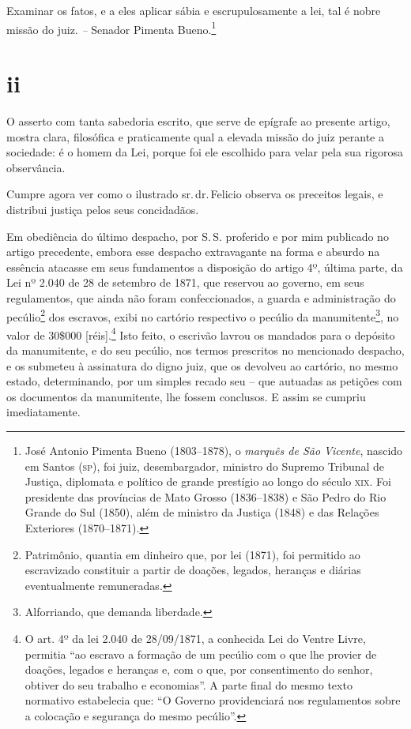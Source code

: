 Examinar os fatos, e a eles aplicar sábia e escrupulosamente a lei, tal
é nobre missão do juiz. \emph{--} Senador Pimenta Bueno.\footnote{ José
  Antonio Pimenta Bueno (1803--1878), o \emph{marquês de São Vicente},
  nascido em Santos (\textsc{sp}), foi juiz, desembargador, ministro do Supremo
  Tribunal de Justiça, diplomata e político de grande prestígio ao longo
  do século \textsc{xix}. Foi presidente das províncias de Mato Grosso
  (1836--1838) e São Pedro do Rio Grande do Sul (1850), além de ministro
  da Justiça (1848) e das Relações Exteriores (1870--1871).}

\section{ii}

O asserto com tanta sabedoria escrito, que serve de epígrafe ao presente
artigo, mostra clara, filosófica e praticamente qual a elevada missão do
juiz perante a sociedade: é o homem da Lei, porque foi ele escolhido
para velar pela sua rigorosa observância.

Cumpre agora ver como o ilustrado sr.\,dr.\,Felicio observa os preceitos
legais, e distribui justiça pelos seus concidadãos.

Em obediência do último despacho, por S.\,S. proferido e por mim
publicado no artigo precedente, embora esse despacho extravagante na
forma e absurdo na essência atacasse em seus fundamentos a disposição do
artigo 4º, última parte, da Lei nº 2.040 de 28 de setembro de 1871, que 
reservou ao governo, em seus regulamentos, que ainda não foram
confeccionados, a guarda e administração do pecúlio\footnote{
  Patrimônio, quantia em dinheiro que, por lei (1871), foi permitido ao
  escravizado constituir a partir de doações, legados, heranças e
  diárias eventualmente remuneradas.} dos escravos, exibi no cartório
respectivo o pecúlio da manumitente\footnote{ Alforriando, que demanda
  liberdade.}, no valor de 30\$000 {[}réis{]}.\footnote{ O art. 4º da
  lei 2.040 de 28/09/1871, a conhecida Lei do Ventre Livre, permitia ``ao
  escravo a formação de um pecúlio com o que lhe provier de doações,
  legados e heranças e, com o que, por consentimento do senhor, obtiver
  do seu trabalho e economias''. A parte final do mesmo texto normativo
  estabelecia que: ``O Governo providenciará nos regulamentos sobre a
  colocação e segurança do mesmo pecúlio''.} Isto feito, o escrivão
lavrou os mandados para o depósito da manumitente, e do seu pecúlio, nos
termos prescritos no mencionado despacho, e os submeteu à assinatura do
digno juiz, que os devolveu ao cartório, no mesmo estado, determinando,
por um simples recado seu -- que autuadas as petições com os documentos
da manumitente, lhe fossem conclusos. E assim se cumpriu
imediatamente.

